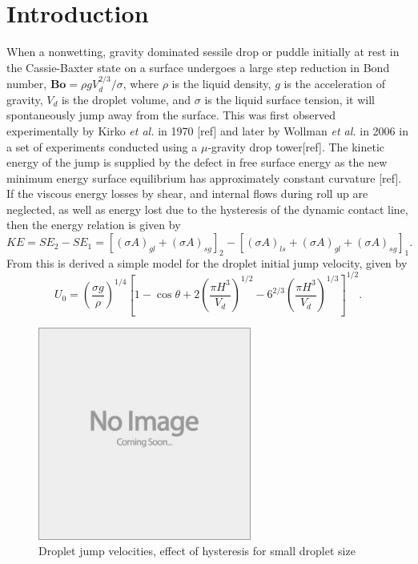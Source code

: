 \documentclass{jfm}
\begin{document}
\section{Introduction}\label{sec:intro}
When a nonwetting, gravity dominated sessile drop or puddle initially at rest in the Cassie-Baxter state on a surface undergoes a large step reduction in Bond number, $\mathbf{Bo} = \rho g V_d^{2/3}/\sigma$, where $\rho$ is the liquid density, $g$ is the acceleration of gravity, $V_d$ is the droplet volume, and $\sigma$ is the liquid surface tension, it will spontaneously jump away from the surface. This was first observed experimentally by Kirko \emph{et al.} in 1970 [ref] and later by Wollman \emph{et al.} in 2006 in a set of experiments conducted using a $\mu$-gravity drop tower[ref]. The kinetic energy of the jump is supplied by the defect in free surface energy as the new minimum energy surface equilibrium has approximately constant curvature [ref]. If the viscous energy losses by shear, and internal flows during roll up are neglected, as well as energy lost due to the hysteresis of the dynamic contact line, then the energy relation is given by 
\[KE = SE_2 -SE_1 = [(\sigma A)_{gl} + (\sigma A)_{sg}]_2 - [(\sigma A)_{ls} + (\sigma A)_{gl} + (\sigma A)_{sg}]_1. \]
From this is derived a simple model for the droplet initial jump velocity, given by
\[U_0 = \left(\frac{\sigma g}{\rho}\right)^{1/4}\left[1-\cos \theta + 2 \left(\frac{\pi H^3}{V_d} \right)^{1/2} - 6^{2/3} \left( \frac{\pi H^3}{V_d} \right)^{1/3} \right]^{1/2}. \]

\begin{figure}
  \centerline{\includegraphics[height=7cm,width=7cm]{e88_1_thumb.jpg}}
  \caption{Droplet jump velocities, effect of hysteresis for small droplet size}
\label{fig:jump_velocities}
\end{figure}
\end{document}
